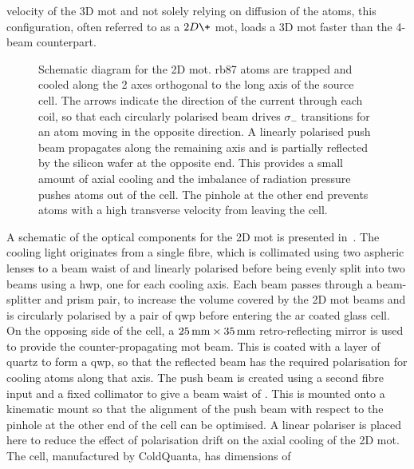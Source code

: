 velocity of the 3D \ac{mot} and not solely relying on diffusion of the atoms,
this configuration, often referred to as a \(2D\+\) \ac{mot}, loads a 3D
\ac{mot} faster than the 4-beam counterpart. \par\noindent
\begin{figure}
    \centering
    \def\svgwidth{0.6\textwidth}
    
    \caption[Schematic for the 2D \ac{mot}]{Schematic diagram for the 2D \ac{mot}. \ac{rb87} atoms are trapped and cooled along the 2 axes orthogonal to the long axis of the source cell. The arrows indicate the direction of the current through each coil, so that each circularly polarised beam drives \(\sigma_-\) transitions for an atom moving in the opposite direction. A linearly polarised push beam propagates along the remaining axis and is partially reflected by the silicon wafer at the opposite end. This provides a small amount of axial cooling and the imbalance of radiation pressure pushes atoms out of the cell. The pinhole at the other end prevents atoms with a high transverse velocity from leaving the cell.}
    \label{fig:2D_mot_diagram}
\end{figure}
A schematic of the optical components for the 2D \ac{mot} is presented
in~. The cooling light originates from a single fibre,
which is collimated using two aspheric lenses to a beam waist of
 and linearly polarised before being evenly split
into two beams using a \ac{hwp}, one for each cooling axis. Each beam passes
through a beam-splitter and prism pair, to increase the volume covered by the
2D \ac{mot} beams and is circularly polarised by a pair of \ac{qwp} before
entering the \ac{ar} coated glass cell. On the opposing side of the cell, a
\(\sivalue{25}{\milli\metre} \times \sivalue{35}{\milli\metre}\)
retro-reflecting mirror is used to provide the counter-propagating \ac{mot}
beam. This is coated with a layer of quartz to form a \ac{qwp}, so that the
reflected beam has the required polarisation for cooling atoms along that
axis. The push beam is created using a second fibre input and a fixed
collimator to give a beam waist of . This is
mounted onto a  kinematic mount so that the alignment of
the push beam with respect to the  pinhole at the
other end of the cell can be optimised. A linear polariser is placed here to
reduce the effect of polarisation drift on the axial cooling of the 2D
\ac{mot}. The cell, manufactured by ColdQuanta, has dimensions of
